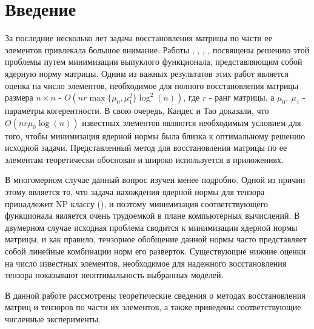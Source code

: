 \section{Введение} 

\par За последние несколько лет задача восстановления матрицы по части ее элементов привлекала большое внимание. Работы
     \cite{6}, \cite{7}, \cite{13}, \cite{21}, посвящены решению этой проблемы путем минимизации выпуклого функционала, 
     представляющим собой ядерную норму матрицы. Одним из важных результатов этих работ является оценка на число элементов,
     необходимое для полного восстановления матрицы размера $n \times n$ - $O(nr\max\{\mu_0, \mu_1^2\}\log^2(n))$, где 
     $r$ - ранг матрицы, а  $\mu_0, \ \mu_1$ - параметры когерентности. В свою очередь, Кандес и Тао доказали, что 
     $O(nr\mu_0\log(n))$ известных элементов являются необходимым условием для того, чтобы минимизация ядерной нормы была 
     близка к оптимальному решению исходной задачи. Представленный метод для восстановления матрицы по ее элементам
     теоретически обоснован и широко используется в приложениях.
\par В многомерном случае данный вопрос изучен менее подробно. Одной из причин этому является то, что задача нахождения ядерной 
     нормы для тензора принадлежит NP классу (\cite{32}), и  поэтому минимизация соответствующего функционала является очень
     трудоемкой в плане компьютерных вычислений. В двумерном случае исходная проблема сводится к минимизации ядерной нормы
     матрицы, и как правило, тензорное обобщение данной нормы часто представляет собой линейные комбинации норм его
     разверток.	Существующие нижние оценки на число известных элементов, необходимое для надежного восстановления 
     тензора показывают неоптимальность выбранных моделей.
\par В данной работе рассмотрены теоретические сведения о методах восстановления матриц и тензоров по части их элементов, 
    а также приведены соответствующие численные эксперименты.